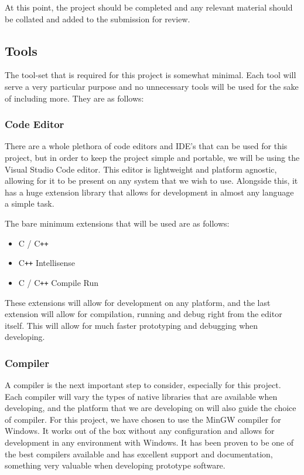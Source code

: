 \documentclass{article}
\begin{document}
At this point, the project should be completed and any relevant material should be collated and added to the submission for review.

\subsection{Tools}
The tool-set that is required for this project is somewhat minimal. Each tool will serve a very particular purpose and no unnecessary tools
will be used for the sake of including more. They are as follows:

    \subsubsection{Code Editor}
    There are a whole plethora of code editors and IDE's that can be used for this project, but in order to keep the project simple and
    portable, we will be using the Visual Studio Code editor. This editor is lightweight and platform agnostic, allowing for it to be
    present on any system that we wish to use. Alongside this, it has a huge extension library that allows for development in almost any
    language a simple task.

    The bare minimum extensions that will be used are as follows:
    \begin{itemize}
        \item C / C\texttt{++}
        \item C\texttt{++} Intellisense
        \item C / C\texttt{++} Compile Run
    \end{itemize}

    These extensions will allow for development on any platform, and the last extension will allow for compilation, running and debug right
    from the editor itself. This will allow for much faster prototyping and debugging when developing.

    \subsubsection{Compiler}
    A compiler is the next important step to consider, especially for this project. Each compiler will vary the types of native libraries
    that are available when developing, and the platform that we are developing on will also guide the choice of compiler. For this project,
    we have chosen to use the MinGW compiler for Windows. It works out of the box without any configuration and allows for development in
    any environment with Windows. It has been proven to be one of the best compilers available and has excellent support and documentation,
    something very valuable when developing prototype software.
\end{document}
